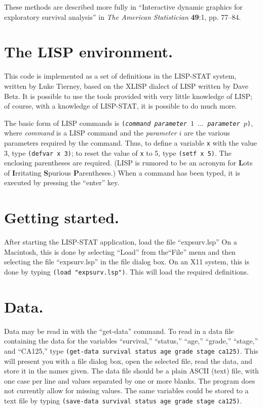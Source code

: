\documentclass[11pt]{article}
\begin{document}
These methods are described more fully in ``Interactive dynamic graphics for
exploratory survival analysis'' in {\em The American Statistician} {\bf 49}:1,
pp. 77--84.
\section{The LISP environment.}
This code is implemented as a set of definitions in the LISP-STAT system, written
by Luke Tierney, based on the XLISP dialect of LISP written by Dave Betz. It is possible
to use the tools provided with very little knowledge of LISP; of course, with
a knowledge of LISP-STAT, it is possible to do much more.

The basic form of LISP commands is {\tt({\it command} {\it parameter $1$} 
$\ldots$ {\it parameter $p$})}, where {\it command} is a LISP command and the
{\it parameter $i$} are the various parameters required by the command. Thus, to define
a variable {\tt x} with the value 3, type {\tt(defvar x 3)}; to reset the value
of {\tt x} to 5, type {\tt(setf x 5)}. The enclosing parentheses are required.
(LISP is rumored to be an acronym for {\bf L}ots of {\bf I}rritating {\bf S}purious
{\bf P}arentheses.) When a command has been typed, it is executed by pressing the
``enter'' key.
\section{Getting started.}
After starting the LISP-STAT application, load the file ``expsurv.lsp'' On
a Macintosh, this is done by
selecting ``Load'' from the``File'' menu and
then selecting the file ``expsurv.lsp'' in the file dialog box. On an X11 system,
this is done by typing {\tt(load "expsurv.lsp")}.
This will load the required
definitions.
\section{Data.}
Data may be read in with the ``get-data'' command. To read in a data file containing
the data for the variables ``survival,'' ``status,'' ``age,'' ``grade,'' ``stage,''
and ``CA125,'' type {\tt(get-data survival status age grade stage ca125)}. This
will present you with a file dialog box, open the selected file, read the data, and
store it in the names given. The data file should be a plain ASCII (text) file, with
one case per line and values separated by one or more blanks. The program does not
currently allow for missing values. The same variables could be stored to a text file
by typing {\tt(save-data survival status age grade stage ca125)}.
\end{document}
